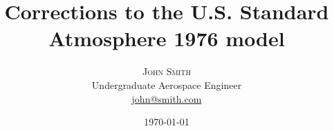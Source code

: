\setlength{\droptitle}{-4\baselineskip} %

\pretitle{\begin{center}\Huge\bfseries} %
\posttitle{\end{center}} %
\title{Corrections to the U.S. Standard Atmosphere 1976 model} %
\author{%
\textsc{John Smith}\\[1ex] %
\normalsize Undergraduate Aerospace Engineer \\ %
\normalsize \href{mailto:john@smith.com}{john@smith.com} %
}
\date{\today} %
\renewcommand{\maketitlehookd}{%
\begin{abstract}
	Lorem ipsum dolor sit amet, consectetur adipiscing elit. Proin cursus
	aliquam turpis, et vulputate arcu laoreet ac. Donec nec metus ornare leo
	tempor vehicula. Nam sit amet porttitor felis. Sed tristique ullamcorper
	imperdiet. Nulla rhoncus vestibulum dolor sit amet mattis. Donec nisi
	quam, venenatis vitae sem id, ullamcorper sollicitudin elit. Curabitur
	maximus velit tempus felis scelerisque, nec mattis est tincidunt.
	Pellentesque nec cursus quam. Ut in lacus vitae enim egestas dignissim.
\end{abstract}
}



